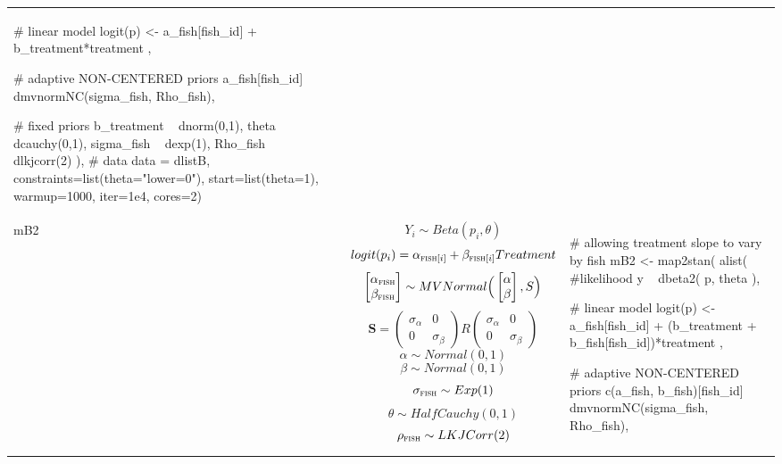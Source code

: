 \begin{longtable}{p{} |p{} |p{} }
{\begin{mylist}
    # linear model
    logit(p) <- a_fish[fish_id] + b_treatment*treatment ,
    
    # adaptive NON-CENTERED priors 
    a_fish[fish_id] ~ dmvnormNC(sigma_fish, Rho_fish),
    
    # fixed priors
    b_treatment ~ dnorm(0,1),
    theta ~ dcauchy(0,1),
    sigma_fish ~ dexp(1),
    Rho_fish ~ dlkjcorr(2)
  ),
  # data
  data = dlistB,
  constraints=list(theta="lower=0"),
  start=list(theta=1), warmup=1000, iter=1e4, cores=2) \end{mylist}}
\\ %
mB2 & %
$$ Y_i \sim Beta(p_i, \theta) $$
\small $$ logit(p_i) =  \alpha_{\textsc{fish}[i]} + \beta_{\textsc{fish}[i]}Treatment$$
$$
\begin{bmatrix}
\alpha_{\textsc{fish}} \\
\beta_{\textsc{fish}}
\end{bmatrix} \sim MVNormal \Big(
\begin{bmatrix}
\alpha \\
\beta
\end{bmatrix}, S \Big)
$$
$$
\mathbf{S} = \left( \begin{array}{cc}
\sigma_\alpha & 0 \\
0 & \sigma_\beta
\end{array} \right) R \left( \begin{array}{cc}
\sigma_\alpha & 0 \\
0 & \sigma_\beta
\end{array} \right)
$$
$$ \alpha  \sim Normal(0,1) $$
$$ \beta  \sim Normal(0,1) $$
$$ \sigma_{\textsc{fish}} \sim Exp(1) $$
$$ \theta \sim HalfCauchy(0, 1) $$
$$ \rho_{\textsc{fish}} \sim LKJCorr(2) $$
&
{\begin{mylist} %
#  allowing treatment slope to vary by fish
mB2 <- map2stan(
  alist(
    #likelihood
    y ~ dbeta2( p, theta ),
    
    # linear model
    logit(p) <- a_fish[fish_id] + (b_treatment + 
    b_fish[fish_id])*treatment ,
    
    # adaptive NON-CENTERED priors 
    c(a_fish, b_fish)[fish_id] ~ dmvnormNC(sigma_fish, 
    Rho_fish),
    

\end{mylist}}
\end{longtable}
